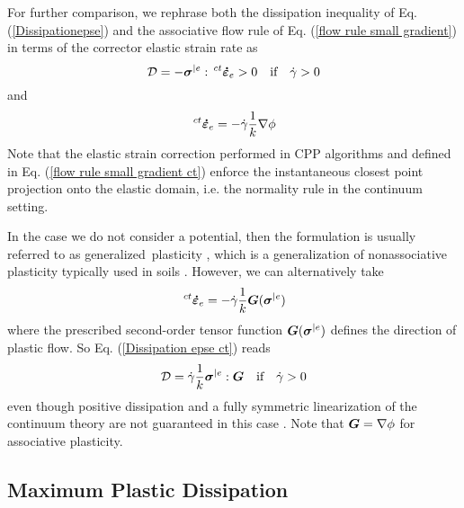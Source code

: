 \documentclass[preprint,review,12pt,sort&compress]{elsarticle}%
\renewcommand{\mathbf}[1]{\mbox{\boldmath $#1$ \unboldmath}  \!\!}
\begin{document}
For further comparison, we rephrase both the dissipation inequality of Eq.
(\ref{Dissipationepse}) and the associative flow rule of Eq.
(\ref{flow rule small gradient}) in terms of the corrector elastic strain rate
as%
\begin{equation}
\mathcal{D}=-\mathbf{\sigma}^{|e}:\,^{ct}\mathbf{\dot{\varepsilon}}%
_{e}>0\text{\quad if}\quad\dot{\gamma}>0 \label{Dissipation epse ct}%
\end{equation}
and%
\begin{equation}
\,^{ct}\mathbf{\dot{\varepsilon}}_{e}=-\dot{\gamma}\frac{1}{k}\nabla
\phi\label{flow rule small gradient ct}%
\end{equation}
Note that the elastic strain correction performed in CPP algorithms and
defined in Eq. (\ref{flow rule small gradient ct}) enforce the instantaneous
closest point projection onto the elastic domain, i.e. the normality rule in
the continuum setting.

In the case we do not consider a potential, then the formulation is usually
referred to as generalized\ plasticity \cite{PastorZ}, which is a
generalization of nonassociative plasticity typically used in soils
\cite{Borjabook}. However, we can alternatively take%
\begin{equation}
\,^{ct}\mathbf{\dot{\varepsilon}}_{e}=-\dot{\gamma}\frac{1}{k}\mathbf{G}%
(\mathbf{\sigma}^{|e}) \label{flow rule nonassociative}%
\end{equation}
where the prescribed second-order tensor function $\mathbf{G}(\mathbf{\sigma
}^{|e})$ defines the direction of plastic flow. So Eq.
(\ref{Dissipation epse ct}) reads%
\begin{equation}
\mathcal{D}=\dot{\gamma}\frac{1}{k}\mathbf{\sigma}^{|e}:\mathbf{G}%
\quad\text{if}\quad\dot{\gamma}>0 \label{dissipation nonassociative}%
\end{equation}
even though positive dissipation and a fully symmetric linearization of the
continuum theory are not guaranteed in this case \cite{Simo98}. Note that
$\mathbf{G}=\nabla\phi$ for associative plasticity.

\subsection{Maximum Plastic Dissipation}
\end{document}
